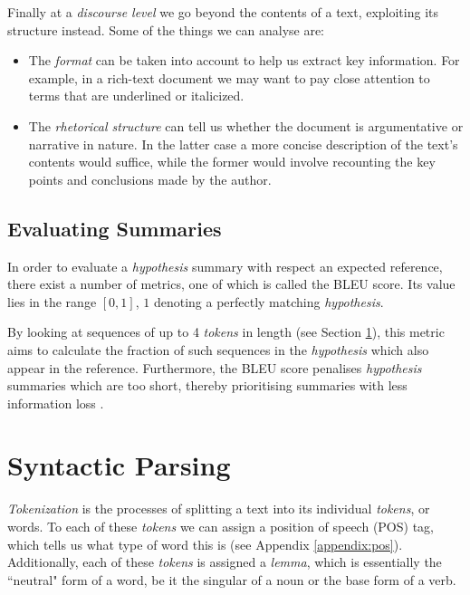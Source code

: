 Finally at a \textit{discourse level} we go beyond the contents of a text, exploiting its structure instead. Some of the things we can analyse are:

\begin{itemize}
\item The \textit{format} can be taken into account to help us extract key information. For example, in a rich-text document we may want to pay close attention to terms that are underlined or italicized.
\item The \textit{rhetorical structure} can tell us whether the document is argumentative or narrative in nature. In the latter case a more concise description of the text's contents would suffice, while the former would involve recounting the key points and conclusions made by the author.
\end{itemize}

\subsection{Evaluating Summaries}

In order to evaluate a \textit{hypothesis} summary with respect an expected reference, there exist a number of metrics, one of which is called the BLEU score. Its value lies in the range $[0,1]$, $1$ denoting a perfectly matching \textit{hypothesis}.

By looking at sequences of up to 4 \textit{tokens} in length (see Section \ref{sec:syntactic_parsing}), this metric aims to calculate the fraction of such sequences in the \textit{hypothesis} which also appear in the reference. Furthermore, the BLEU score penalises \textit{hypothesis} summaries which are too short, thereby prioritising summaries with less information loss \cite{ehling_minimum_2007}.

\section{Syntactic Parsing}
\label{sec:syntactic_parsing}

\textit{Tokenization} is the processes of splitting a text into its individual \textit{tokens}, or words. To each of these \textit{tokens} we can assign a position of speech (POS) tag, which tells us what type of word this is (see Appendix \ref{appendix:pos}). Additionally, each of these \textit{tokens} is assigned a \textit{lemma}, which is essentially the ``neutral" form of a word, be it the singular of a noun or the base form of a verb.

